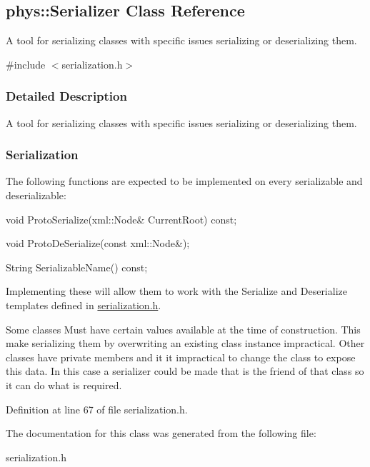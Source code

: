 \hypertarget{classphys_1_1Serializer}{
\subsection{phys::Serializer Class Reference}
\label{classphys_1_1Serializer}
}


A tool for serializing classes with specific issues serializing or deserializing them.  




{\ttfamily \#include $<$serialization.h$>$}



\subsubsection{Detailed Description}
A tool for serializing classes with specific issues serializing or deserializing them. \hypertarget{classphys_1_1Serializer_Serialization}{}\subsubsection{Serialization}\label{classphys_1_1Serializer_Serialization}
The following functions are expected to be implemented on every serializable and deserializable:\par
 void ProtoSerialize(xml::Node\& CurrentRoot) const; \par
 void ProtoDeSerialize(const xml::Node\&); \par
 String SerializableName() const; \par
 Implementing these will allow them to work with the Serialize and Deserialize templates defined in \hyperlink{serialization_8h_source}{serialization.h}.

Some classes Must have certain values available at the time of construction. This make serializing them by overwriting an existing class instance impractical. Other classes have private members and it it impractical to change the class to expose this data. In this case a serializer could be made that is the friend of that class so it can do what is required. 

Definition at line 67 of file serialization.h.



The documentation for this class was generated from the following file:\begin{DoxyCompactItemize}
\item 
serialization.h\end{DoxyCompactItemize}

